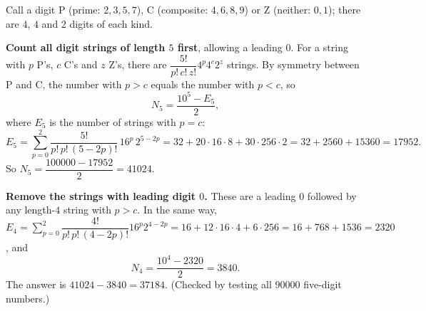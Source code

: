 Call a digit P (prime: $2,3,5,7$), C (composite: $4,6,8,9$) or Z (neither: $0,1$); there are $4$, $4$ and $2$ digits of each kind.

\textbf{Count all digit strings of length $5$ first}, allowing a leading $0$. For a string with $p$ P's, $c$ C's and $z$ Z's, there are $\dfrac{5!}{p!\,c!\,z!}4^p4^c2^z$ strings. By symmetry between P and C, the number with $p>c$ equals the number with $p<c$, so
\[
N_{5}=\dfrac{10^5-E_5}{2},
\]
where $E_5$ is the number of strings with $p=c$:
\[
E_5=\sum_{p=0}^{2}\dfrac{5!}{p!\,p!\,(5-2p)!}\,16^p\,2^{5-2p}=32+20\cdot16\cdot8+30\cdot256\cdot2=32+2560+15360=17952 .
\]
So $N_5=\dfrac{100000-17952}{2}=41024$.

\textbf{Remove the strings with leading digit $0$.} These are a leading $0$ followed by any length-$4$ string with $p>c$. In the same way, $E_4=\displaystyle\sum_{p=0}^{2}\dfrac{4!}{p!\,p!\,(4-2p)!}16^p2^{4-2p}=16+12\cdot16\cdot4+6\cdot256=16+768+1536=2320$, and
\[
N_4=\dfrac{10^4-2320}{2}=3840 .
\]
The answer is $41024-3840=\boxed{37184}$. (Checked by testing all $90000$ five-digit numbers.)
